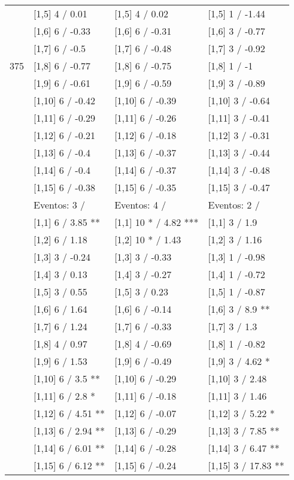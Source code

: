 \begin{table}
\begin{tabular}[t]{llll}
 & {}[1,5] 4  / 0.01 & {}[1,5] 4  / 0.02 & {}[1,5] 1  / -1.44\\
 & {}[1,6] 6  / -0.33 & {}[1,6] 6  / -0.31 & {}[1,6] 3  / -0.77\\
 & {}[1,7] 6  / -0.5 & {}[1,7] 6  / -0.48 & {}[1,7] 3  / -0.92\\
375 & {}[1,8] 6  / -0.77 & {}[1,8] 6  / -0.75 & {}[1,8] 1  / -1\\
\addlinespace
 & {}[1,9] 6  / -0.61 & {}[1,9] 6  / -0.59 & {}[1,9] 3  / -0.89\\
 & {}[1,10] 6  / -0.42 & {}[1,10] 6  / -0.39 & {}[1,10] 3  / -0.64\\
 & {}[1,11] 6  / -0.29 & {}[1,11] 6  / -0.26 & {}[1,11] 3  / -0.41\\
 & {}[1,12] 6  / -0.21 & {}[1,12] 6  / -0.18 & {}[1,12] 3  / -0.31\\
 & {}[1,13] 6  / -0.4 & {}[1,13] 6  / -0.37 & {}[1,13] 3  / -0.44\\
\addlinespace
 & {}[1,14] 6  / -0.4 & {}[1,14] 6  / -0.37 & {}[1,14] 3  / -0.48\\
 & {}[1,15] 6  / -0.38 & {}[1,15] 6  / -0.35 & {}[1,15] 3  / -0.47\\
 & Eventos:  3 / & Eventos:  4 / & Eventos:  2 /\\
 & {}[1,1] 6  / 3.85 ** & {}[1,1] 10 * / 4.82 *** & {}[1,1] 3  / 1.9\\
 & {}[1,2] 6  / 1.18 & {}[1,2] 10 * / 1.43 & {}[1,2] 3  / 1.16\\
\addlinespace
 & {}[1,3] 3  / -0.24 & {}[1,3] 3  / -0.33 & {}[1,3] 1  / -0.98\\
 & {}[1,4] 3  / 0.13 & {}[1,4] 3  / -0.27 & {}[1,4] 1  / -0.72\\
 & {}[1,5] 3  / 0.55 & {}[1,5] 3  / 0.23 & {}[1,5] 1  / -0.87\\
 & {}[1,6] 6  / 1.64 & {}[1,6] 6  / -0.14 & {}[1,6] 3  / 8.9 **\\
 & {}[1,7] 6  / 1.24 & {}[1,7] 6  / -0.33 & {}[1,7] 3  / 1.3\\
\addlinespace
500 & {}[1,8] 4  / 0.97 & {}[1,8] 4  / -0.69 & {}[1,8] 1  / -0.82\\
 & {}[1,9] 6  / 1.53 & {}[1,9] 6  / -0.49 & {}[1,9] 3  / 4.62 *\\
 & {}[1,10] 6  / 3.5 ** & {}[1,10] 6  / -0.29 & {}[1,10] 3  / 2.48\\
 & {}[1,11] 6  / 2.8 * & {}[1,11] 6  / -0.18 & {}[1,11] 3  / 1.46\\
 & {}[1,12] 6  / 4.51 ** & {}[1,12] 6  / -0.07 & {}[1,12] 3  / 5.22 *\\
\addlinespace
 & {}[1,13] 6  / 2.94 ** & {}[1,13] 6  / -0.29 & {}[1,13] 3  / 7.85 **\\
 & {}[1,14] 6  / 6.01 ** & {}[1,14] 6  / -0.28 & {}[1,14] 3  / 6.47 **\\
 & {}[1,15] 6  / 6.12 ** & {}[1,15] 6  / -0.24 & {}[1,15] 3  / 17.83 **\\
\bottomrule
\end{tabular}
\end{table}
